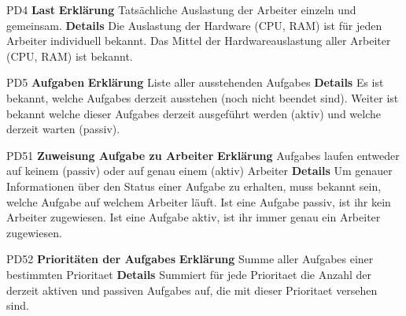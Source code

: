 \documentclass[a4paper,12pt]{article}
\begin{document}
\begin{itemize}[nosep]
\begin{minipage}[t]{\linewidth}
\item[PD4] \textbf{Last}
\subitem \textbf{Erklärung} Tatsächliche Auslastung der Arbeiter einzeln und gemeinsam.
\subitem \textbf{Details} Die Auslastung der Hardware (\gls{CPU}, RAM) ist für jeden Arbeiter individuell bekannt.\newline
Das Mittel der Hardwareauslastung aller Arbeiter (\gls{CPU}, RAM) ist bekannt.
\end{minipage}
\vspace{20mm}

\begin{minipage}[t]{\linewidth}
\item[PD5] \textbf{Aufgaben}
\subitem \textbf{Erklärung} Liste aller ausstehenden \glspl{Aufgabe}
\subitem \textbf{Details} Es ist bekannt, welche \glspl{Aufgabe} derzeit ausstehen (noch nicht beendet sind). Weiter ist bekannt welche dieser \glspl{Aufgabe} derzeit ausgeführt werden (aktiv) und welche derzeit warten (passiv).
\end{minipage}
\vspace{20mm}

\begin{minipage}[t]{\linewidth}
\item[PD51] \textbf{Zuweisung \gls{Aufgabe} zu Arbeiter}
\subitem \textbf{Erklärung} \glspl{Aufgabe} laufen entweder auf keinem (passiv) oder auf genau einem (aktiv) Arbeiter
\subitem \textbf{Details} Um genauer Informationen über den Status einer \gls{Aufgabe} zu erhalten, muss bekannt sein, welche \gls{Aufgabe} auf welchem Arbeiter läuft.\newline
Ist eine \gls{Aufgabe} passiv, ist ihr kein Arbeiter zugewiesen.\newline
Ist eine \gls{Aufgabe} aktiv, ist ihr immer genau ein Arbeiter zugewiesen.
\end{minipage}
\vspace{20mm}

\begin{minipage}[t]{\linewidth}
\item[PD52] \textbf{Prioritäten der \glspl{Aufgabe}}
\subitem \textbf{Erklärung} Summe aller \glspl{Aufgabe} einer bestimmten \gls{Prioritaet}
\subitem \textbf{Details} Summiert für jede \gls{Prioritaet} die Anzahl der derzeit aktiven und passiven \glspl{Aufgabe} auf, die mit dieser \gls{Prioritaet} versehen sind.
\end{minipage}
\vspace{20mm}


\end{itemize}
\end{document}
